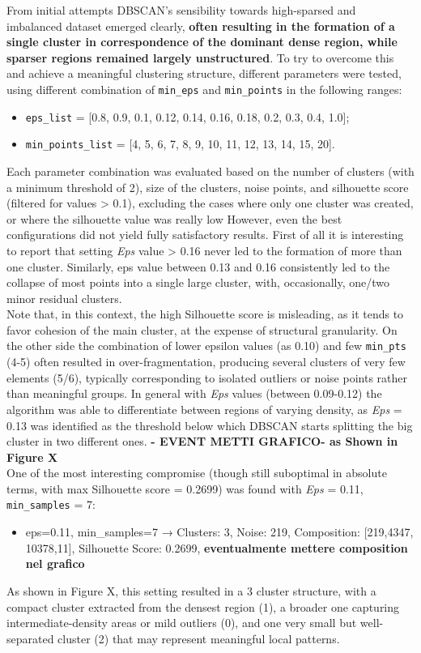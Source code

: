 From initial attempts DBSCAN's sensibility towards high-sparsed and imbalanced dataset emerged clearly,
\textbf{often resulting in the formation of a single cluster in correspondence of the dominant dense region, while sparser regions remained largely unstructured}. 
To try to overcome this and achieve a meaningful clustering structure, different parameters were tested, 
using different combination of \texttt{min\_eps} and \texttt{min\_points} in the following ranges:
\begin{itemize}
    \item \texttt{eps\_list} =  [0.8, 0.9, 0.1, 0.12, 0.14, 0.16, 0.18, 0.2, 0.3, 0.4, 1.0];
    \item \texttt{min\_points\_list} =  [4, 5, 6, 7, 8, 9, 10, 11, 12, 13, 14, 15, 20].
\end{itemize}

Each parameter combination was evaluated based on the number of clusters (with a minimum threshold of 2), size of the clusters, noise points, and silhouette score 
(filtered for values > 0.1), excluding the cases where only one cluster was created, or where the silhouette value was really low
However, even the best configurations did not yield fully satisfactory results.
First of all it is interesting to report that setting \textit{Eps} value > 0.16 never led to the formation of more than one cluster. 
Similarly, eps value between 0.13 and 0.16 consistently led to the collapse of most points into a single large cluster, with, occasionally, one/two minor residual clusters. \\

Note that, in this context, the high Silhouette score is misleading, as it tends to favor cohesion of the main cluster, at the expense of structural granularity.
On the other side the combination of lower epsilon values (as 0.10) and few \texttt{min\_pts} (4-5) 
often resulted in over-fragmentation, producing several clusters of very few elements (5/6), typically corresponding to isolated outliers or noise points rather than meaningful groups.
In general with \textit{Eps} values (between 0.09-0.12) the algorithm was able to differentiate between regions of varying density, as \textit{Eps} = 0.13 was identified as the threshold below which DBSCAN starts splitting the big cluster in two different ones.
\textbf{- EVENT METTI GRAFICO-  as Shown in Figure X}\\

One of the most interesting compromise (though still suboptimal in absolute terms, with max Silhouette score = 0.2699) was found with \textit{Eps} = 0.11, \texttt{min\_samples} = 7:
\begin{itemize}
    \item eps=0.11, min\_samples=7 → Clusters: 3, Noise: 219,  Composition: [219,4347, 10378,11], Silhouette Score: 0.2699, \textbf{eventualmente mettere composition nel grafico}
\end{itemize}
As shown in Figure X, this setting resulted in  a 3 cluster structure, with a  compact cluster extracted from the densest region (1), a broader one capturing intermediate-density areas or mild outliers (0), 
and one very small but well-separated cluster (2) that may represent meaningful local patterns. \\


